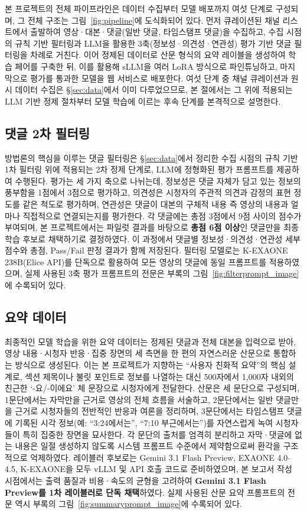 \documentclass[11pt,a4paper]{article}
\begin{document}
본 프로젝트의 전체 파이프라인은 데이터 수집부터 모델 배포까지 여섯 단계로 구성되며, 그 전체 구조는 그림~\ref{fig:pipeline}에 도식화되어 있다. 먼저 큐레이션된 채널 리스트에서 출발하여 영상·대본·댓글(일반 댓글, 타임스탬프 댓글)을 수집하고, 수집 시점의 규칙 기반 필터링과 LLM을 활용한 3축(정보성·의견성·연관성) 평가 기반 댓글 필터링을 차례로 거친다. 이어 정제된 데이터로 산문 형식의 요약 레이블을 생성하여 학습 페어를 구축한 뒤, 이를 활용해 sLLM을 여러 LoRA 방식으로 파인튜닝하고, 마지막으로 평가를 통과한 모델을 웹 서비스로 배포한다. 여섯 단계 중 채널 큐레이션과 원시 데이터 수집은 \S\ref{sec:data}에서 이미 다루었으므로, 본 절에서는 그 위에 적용되는 LLM 기반 정제 절차부터 모델 학습에 이르는 후속 단계를 본격적으로 설명한다.

\subsection{댓글 2차 필터링}
방법론의 핵심을 이루는 댓글 필터링은 \S\ref{sec:data}에서 정리한 수집 시점의 규칙 기반 1차 필터링 위에 적용되는 2차 정제 단계로, LLM에 정형화된 평가 프롬프트를 제공하여 수행된다. 평가는 세 가지 축으로 나뉘는데, 정보성은 댓글 자체가 담고 있는 정보의 풍부함을 1점에서 3점으로 평가하고, 의견성은 시청자의 주관적 의견과 감정의 표현 정도를 같은 척도로 평가하며, 연관성은 댓글이 대본의 구체적 내용 즉 영상의 내용과 얼마나 직접적으로 연결되는지를 평가한다. 각 댓글에는 총점 3점에서 9점 사이의 점수가 부여되며, 본 프로젝트에서는 파일럿 결과를 바탕으로 \textbf{총점 6점 이상}인 댓글만을 최종 학습 후보로 채택하기로 결정하였다. 이 과정에서 댓글별 정보성·의견성·연관성 세부 점수와 총점, Pass/Fail 판정 결과가 함께 저장된다. 필터링 모델로는 K-EXAONE 238B(Elice API)를 단독으로 활용하여 모든 영상의 댓글에 동일 프롬프트를 적용하였으며, 실제 사용된 3축 평가 프롬프트의 전문은 부록의 그림~\ref{fig:filterprompt_image}에 수록되어 있다.

\subsection{요약 데이터}
최종적인 모델 학습을 위한 요약 데이터는 정제된 댓글과 전체 대본을 입력으로 받아, 영상 내용·시청자 반응·집중 장면의 세 측면을 한 편의 자연스러운 산문으로 통합하는 방식으로 생성된다. 이는 본 프로젝트가 지향하는 ``사용자 친화적 요약''의 핵심 설계로, 섹션 제목이나 불릿 포인트로 정보를 나열하는 대신 500자에서 1{,}000자 내외의 친근한 `-요/-이에요' 체 문장으로 시청자에게 전달한다. 산문은 세 문단으로 구성되며, 1문단에서는 자막만을 근거로 영상의 전체 흐름을 서술하고, 2문단에서는 일반 댓글만을 근거로 시청자들의 전반적인 반응과 여론을 정리하며, 3문단에서는 타임스탬프 댓글에 기록된 시각 정보(예: ``3:24에서는'', ``7:10 부근에서는'')를 자연스럽게 녹여 시청자들이 특히 집중한 장면을 묘사한다. 각 문단의 출처를 엄격히 분리하고 자막·댓글에 없는 내용은 일절 생성하지 않도록 시스템 프롬프트 수준에서 제약함으로써 환각을 구조적으로 억제하였다. 레이블러 후보로는 Gemini 3.1 Flash Preview, EXAONE 4.0$\cdot$4.5, K-EXAONE을 모두 vLLM 및 API 호출 코드로 준비하였으며, 본 보고서 작성 시점에서는 출력 품질과 비용·속도의 균형을 고려하여 \textbf{Gemini 3.1 Flash Preview를 1차 레이블러로 단독 채택}하였다. 실제 사용된 산문 요약 프롬프트의 전문 역시 부록의 그림~\ref{fig:summaryprompt_image}에 수록되어 있다.
\end{document}
